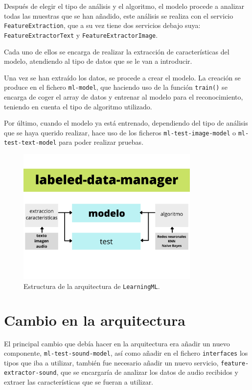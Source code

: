 \documentclass[a4paper, 12pt]{book}
\begin{document}
Después de elegir el tipo de análisis y el algoritmo, el modelo procede a analizar todas las muestras que se han añadido, este análisis se realiza con el servicio \texttt{FeatureExtraction}, que a su vez tiene dos servicios debajo suya: \texttt{FeatureExtractorText} y \texttt{FeatureExtractorImage}.

Cada uno de ellos se encarga de realizar la extracción de características del modelo, atendiendo al tipo de datos que se le van a introducir.

Una vez se han extraído los datos, se procede a crear el modelo. La creación se produce en el fichero \texttt{ml-model}, que haciendo uso de la función \texttt{train()} se encarga de coger el array de datos y entrenar al modelo para el reconocimiento, teniendo en cuenta el tipo de algoritmo utilizado.

Por último, cuando el modelo ya está entrenado, dependiendo del tipo de análisis que se haya querido realizar, hace uso de los ficheros \texttt{ml-test-image-model} o \texttt{ml-test-text-model} para poder realizar pruebas.

\begin{figure}
	\centering
	\includegraphics[width=9cm, keepaspectratio]{img/arquitectura-learningml.png}
	\caption{Estructura de la arquitectura de \texttt{LearningML}.}\label{fig:arquitectura}
\end{figure}

\section{Cambio en la arquitectura}
\label{sec:cambio-arquitectura}

El principal cambio que debía hacer en la arquitectura era añadir un nuevo componente, \texttt{ml-test-sound-model}, así como añadir en el fichero \texttt{interfaces} los tipos que iba a utilizar, también fue necesario añadir un nuevo servicio, \texttt{feature-extractor-sound}, que se encargaría de analizar los datos de audio recibidos y extraer las características que se fueran a utilizar.
\end{document}

